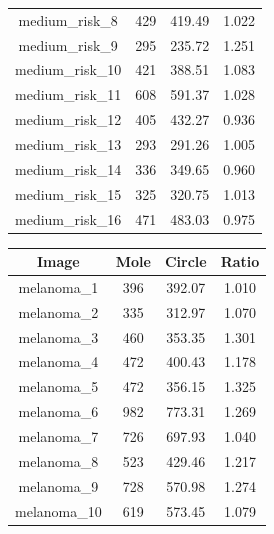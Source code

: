 \documentclass[a4paper,12pt,oneside,titlepage]{article}
\begin{document}
\begin{table}[H]
\begin{minipage}[b]{0.5\linewidth}
\begin{tabular}{|c|c|c|c|}
				medium\_risk\_8                       &429                    &419.49      &1.022\\
				medium\_risk\_9                       &295            &235.72      &1.251\\
				medium\_risk\_10                      &421                    &388.51      &1.083\\
				medium\_risk\_11                       &608                    &591.37      &1.028\\
				medium\_risk\_12                      &405                    &432.27      &0.936\\
				medium\_risk\_13                      &293                    &291.26      &1.005\\
				medium\_risk\_14                      &336                    &349.65      &0.960\\
				medium\_risk\_15                      &325                    &320.75      &1.013\\
				medium\_risk\_16                      &471                    &483.03      &0.975\\
				\hline
			\end{tabular}
		\end{minipage}
		\hspace{0.6cm}
		\begin{minipage}[b]{0.1\linewidth}
			\centering
			\begin{tabular}{|c|c|c|c|}
				\hline
				\textbf{Image}  & \textbf{Mole} & \textbf{Circle} & \textbf{Ratio} \\
				\hline
				melanoma\_1                         &396   &392.07   &1.010\\
				melanoma\_2                         &335   &312.97   &1.070\\
				melanoma\_3                         &460   &353.35   &1.301\\
				melanoma\_4                         &472   &400.43 &1.178\\
				melanoma\_5                         &472   &356.15   &1.325\\
				melanoma\_6                         &982   &773.31   &1.269\\
				melanoma\_7                         &726   &697.93   &1.040\\
				melanoma\_8                         &523   &429.46   &1.217\\
				melanoma\_9                         &728   &570.98   &1.274\\
				melanoma\_10                        &619   &573.45   &1.079\\

\end{tabular}
\end{minipage}
\end{table}
\end{document}
